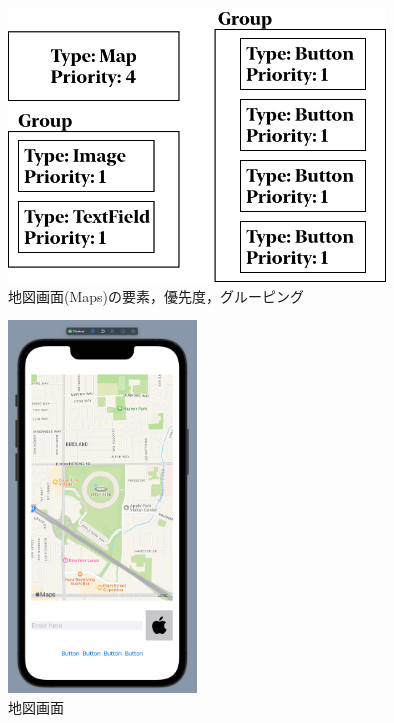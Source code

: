 \begin{figure}[htbp]
  \begin{minipage}{\hsize}
    \begin{center}
       \includegraphics[width=100mm]{img/Maps_ViewStructure.png}
    \end{center}
    \caption{地図画面(Maps)の要素，優先度，グルーピング}
    \label{fig:Maps_ViewStructure}
  \end{minipage}
\end{figure}

\begin{figure}[htbp]
  \begin{minipage}{\hsize}
    \begin{center}
       \includegraphics[width=50mm]{img/Maps_autogen.png}
    \end{center}
    \caption{地図画面}
    \label{fig:Maps_autogen}
  \end{minipage}
\end{figure}


